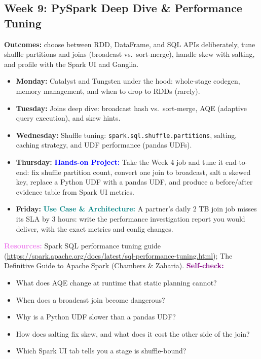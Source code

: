 \documentclass[11pt, a4paper]{article}
\newcommand{\project}[1]{\vspace{1mm}\noindent\textbf{\textcolor{blue}{Hands-on Project:}} #1}
\newcommand{\usecase}[1]{\vspace{1mm}\noindent\textbf{\textcolor{teal}{Use Case \& Architecture:}} #1}
\newcommand{\dayitem}[2]{\item \textbf{#1:} #2}
\newcommand{\resources}[1]{\vspace{1mm}\noindent\textbf{\textcolor{violet}{Resources:}} #1}
\newcommand{\selfcheck}[1]{\vspace{1mm}\noindent\textbf{\textcolor{purple}{Self-check:}} #1}
\begin{document}
\subsection*{Week 9: PySpark Deep Dive \& Performance Tuning}
\par\noindent\textbf{Outcomes:} choose between RDD, DataFrame, and SQL APIs deliberately, tune shuffle partitions and joins (broadcast vs.\ sort-merge), handle skew with salting, and profile with the Spark UI and Ganglia.
\begin{itemize}[label=-]
    \dayitem{Monday}{Catalyst and Tungsten under the hood: whole-stage codegen, memory management, and when to drop to RDDs (rarely).}
    \dayitem{Tuesday}{Joins deep dive: broadcast hash vs.\ sort-merge, AQE (adaptive query execution), and skew hints.}
    \dayitem{Wednesday}{Shuffle tuning: \texttt{spark.sql.shuffle.partitions}, salting, caching strategy, and UDF performance (pandas UDFs).}
    \dayitem{Thursday}{\project{Take the Week 4 job and tune it end-to-end: fix shuffle partition count, convert one join to broadcast, salt a skewed key, replace a Python UDF with a pandas UDF, and produce a before/after evidence table from Spark UI metrics.}}
    \dayitem{Friday}{\usecase{A partner's daily 2 TB join job misses its SLA by 3 hours: write the performance investigation report you would deliver, with the exact metrics and config changes.}}
\end{itemize}
\resources{Spark SQL performance tuning guide (\url{https://spark.apache.org/docs/latest/sql-performance-tuning.html}); The Definitive Guide to Apache Spark (Chambers \& Zaharia).}
\selfcheck{\begin{itemize}[label=-, leftmargin=1.5em, itemsep=0pt]
    \item What does AQE change at runtime that static planning cannot?
    \item When does a broadcast join become dangerous?
    \item Why is a Python UDF slower than a pandas UDF?
    \item How does salting fix skew, and what does it cost the other side of the join?
    \item Which Spark UI tab tells you a stage is shuffle-bound?
\end{itemize}}
\end{document}
